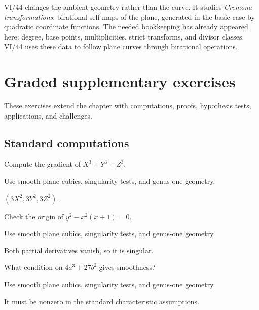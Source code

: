 VI/44 changes the ambient geometry rather than the curve.  It studies \emph{Cremona transformations}: birational self-maps of the plane, generated in the basic case by quadratic coordinate functions.  The needed bookkeeping has already appeared here: degree, base points, multiplicities, strict transforms, and divisor classes.  VI/44 uses these data to follow plane curves through birational operations.
\section{Graded supplementary exercises}
These exercises extend the chapter with computations, proofs, hypothesis tests, applications, and challenges.

\subsection*{Standard computations}

\begin{exercise}\label{exr:vi43-expand-01}
Compute the gradient of $X^3+Y^3+Z^3$.
\end{exercise}
\begin{hint}
Use smooth plane cubics, singularity tests, and genus-one geometry.
\end{hint}
\begin{solution}
$(3X^2,3Y^2,3Z^2)$.
\end{solution}

\begin{exercise}\label{exr:vi43-expand-02}
Check the origin of $y^2-x^2(x+1)=0$.
\end{exercise}
\begin{hint}
Use smooth plane cubics, singularity tests, and genus-one geometry.
\end{hint}
\begin{solution}
Both partial derivatives vanish, so it is singular.
\end{solution}

\begin{exercise}\label{exr:vi43-expand-03}
What condition on $4a^3+27b^2$ gives smoothness?
\end{exercise}
\begin{hint}
Use smooth plane cubics, singularity tests, and genus-one geometry.
\end{hint}
\begin{solution}
It must be nonzero in the standard characteristic assumptions.
\end{solution}

